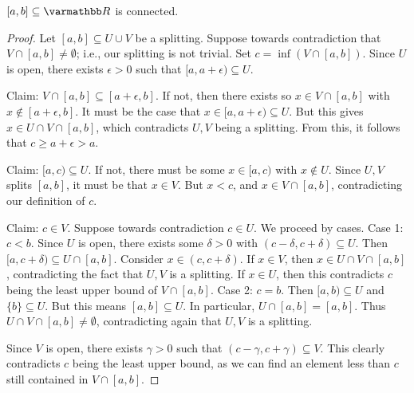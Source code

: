     \begin{lemma}
        
    \end{lemma}

    \newpage
    \begin{proposition}
        $[a,b] \subseteq \bfR$ is connected.
    \end{proposition}
        \begin{proof}
            Let $[a,b] \subseteq U \cup V$ be a splitting. Suppose towards contradiction that $V \cap [a,b] \neq \emptyset$; i.e., our splitting is not trivial. Set $c = \inf (V \cap [a,b])$. Since $U$ is open, there exists $\epsilon > 0$ such that $[a,a+\epsilon) \subseteq U$.

            Claim: $V \cap [a,b] \subseteq [a+\epsilon,b]$. If not, then there exists so $x \in V \cap [a,b]$ with $x \not\in [a+\epsilon,b]$. It must be the case that $x \in [a,a+\epsilon) \subseteq U$. But this gives $x \in U \cap V \cap [a,b]$, which contradicts $U,V$ being a splitting. From this, it follows that $c \geq a+\epsilon > a$.

            Claim: $[a,c) \subseteq U$. If not, there must be some $x \in [a,c)$ with $x \not\in U$. Since $U,V$ splits $[a,b]$, it must be that $x \in V$. But $x < c$, and $x \in V \cap [a,b]$, contradicting our definition of $c$.

            Claim: $c \in V$. Suppose towards contradiction $c \in U$. We proceed by cases. Case 1: $c < b$. Since $U$ is open, there exists some $\delta > 0$ with $(c-\delta,c+\delta) \subseteq U$. Then $[a,c+\delta) \subseteq U \cap [a,b]$. Consider $x \in (c,c+\delta)$. If $x \in V$, then $x \in U \cap V \cap [a,b]$, contradicting the fact that $U,V$ is a splitting. If $x \in U$, then this contradicts $c$ being the least upper bound of $V \cap [a,b]$. Case 2: $c = b$. Then $[a,b) \subseteq U$ and $\{b\} \subseteq U$. But this means $[a,b] \subseteq U$. In particular, $U \cap [a,b] = [a,b]$. Thus $U \cap V \cap [a,b] \neq \emptyset$, contradicting again that $U,V$ is a splitting.

            Since $V$ is open, there exists $\gamma > 0$ such that $(c-\gamma,c+\gamma) \subseteq V$. This clearly contradicts $c$ being the least upper bound, as we can find an element less than $c$ still contained in $V \cap [a,b]$.
        \end{proof}



    

    

    
    





    
    